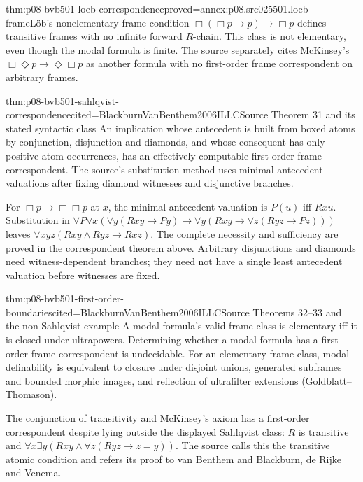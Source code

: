 \begin{hbtheorem}{thm:p08-bvb501-loeb-correspondence}{proved=annex:p08.src025501.loeb-frame}{L\"ob's nonelementary frame condition}
\(\Box(\Box p\to p)\to\Box p\) defines transitive frames
with no infinite forward \(R\)-chain. This class is not elementary,
even though the modal formula is finite. The source separately cites
McKinsey's \(\Box\Diamond p\to\Diamond\Box p\) as another
formula with no first-order frame correspondent on arbitrary frames.
\end{hbtheorem}

\begin{hbtheorem}{thm:p08-bvb501-sahlqvist-correspondence}{cited=BlackburnVanBenthem2006ILLC}{Source Theorem 31 and its stated syntactic class}
An implication whose antecedent is built from boxed atoms by conjunction,
disjunction and diamonds, and whose consequent has only positive atom
occurrences, has an effectively computable first-order frame correspondent.
The source's substitution method uses minimal antecedent valuations
after fixing diamond witnesses and disjunctive branches.
\end{hbtheorem}

For \(\Box p\to\Box\Box p\) at \(x\), the minimal
antecedent valuation is \(P(u)\) iff \(Rxu\). Substitution in
\(\forall P\forall x(\forall y(Rxy\to Py)\to
\forall y(Rxy\to\forall z(Ryz\to Pz)))\) leaves
\(\forall xyz(Rxy\land Ryz\to Rxz)\). The complete necessity
and sufficiency are proved in the correspondent theorem above. Arbitrary
disjunctions and diamonds need witness-dependent branches; they need
not have a single least antecedent valuation before witnesses are fixed.

\begin{hbtheorem}{thm:p08-bvb501-first-order-boundaries}{cited=BlackburnVanBenthem2006ILLC}{Source Theorems 32--33 and the non-Sahlqvist example}
A modal formula's valid-frame class is elementary iff it is closed
under ultrapowers. Determining whether a modal formula has a first-order
frame correspondent is undecidable. For an elementary frame class,
modal definability is equivalent to closure under disjoint unions,
generated subframes and bounded morphic images, and reflection of
ultrafilter extensions (Goldblatt--Thomason).

The conjunction of transitivity and McKinsey's axiom has a first-order
correspondent despite lying outside the displayed Sahlqvist class:
\(R\) is transitive and
\(\forall x\exists y(Rxy\land\forall z(Ryz\to z=y))\).
The source calls this the transitive atomic condition and refers its
proof to van Benthem and Blackburn, de Rijke and Venema.
\end{hbtheorem}

